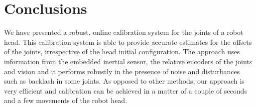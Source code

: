 \section{Conclusions}\label{sec:conclusions}



We have presented a robust, online calibration system for
the joints of a robot head. This calibration system is able to provide accurate estimates for the offsets of the joints, irrespective of the head initial configuration.
The approach uses information from the embedded inertial
sensor, the relative encoders of the joints and vision and it performs robustly in the presence of noise and disturbances such as backlash in some joints. As opposed to other methods, our approach is very efficient and calibration can be achieved in a matter of a couple of seconds and a few movements of the robot head.

